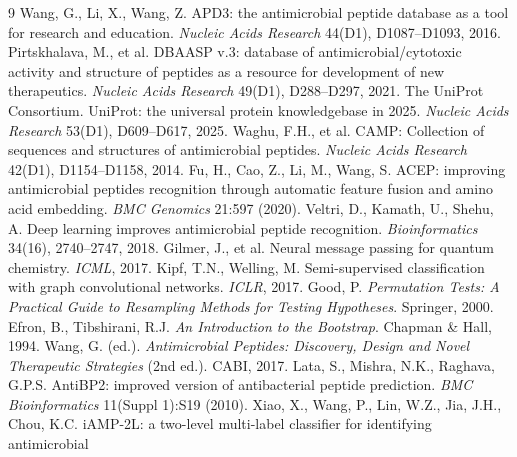 \documentclass[12pt]{article}
\begin{document}
























\begin{thebibliography}{9}
 Wang, G., Li, X., Wang, Z. APD3: the antimicrobial peptide
database as a tool for research and education. \emph{Nucleic Acids Research}
44(D1), D1087--D1093, 2016.
 Pirtskhalava, M., et al. DBAASP v.3: database of
antimicrobial/cytotoxic activity and structure of peptides as a resource for
development of new therapeutics. \emph{Nucleic Acids Research} 49(D1),
D288--D297, 2021.
 The UniProt Consortium. UniProt: the universal protein
knowledgebase in 2025. \emph{Nucleic Acids Research} 53(D1), D609--D617, 2025.
 Waghu, F.H., et al. CAMP: Collection of sequences and
structures of antimicrobial peptides. \emph{Nucleic Acids Research} 42(D1),
D1154--D1158, 2014.
 Fu, H., Cao, Z., Li, M., Wang, S. ACEP: improving antimicrobial
peptides recognition through automatic feature fusion and amino acid embedding.
\emph{BMC Genomics} 21:597 (2020).
 Veltri, D., Kamath, U., Shehu, A. Deep learning improves
antimicrobial peptide recognition. \emph{Bioinformatics} 34(16),
2740--2747, 2018.
 Gilmer, J., et al. Neural message passing for quantum
chemistry. \emph{ICML}, 2017.
 Kipf, T.N., Welling, M. Semi-supervised classification
with graph convolutional networks. \emph{ICLR}, 2017.
 Good, P. \emph{Permutation Tests: A Practical Guide to
Resampling Methods for Testing Hypotheses}. Springer, 2000.
 Efron, B., Tibshirani, R.J. \emph{An Introduction to the
Bootstrap}. Chapman \& Hall, 1994.
 Wang, G. (ed.). \emph{Antimicrobial Peptides: Discovery,
Design and Novel Therapeutic Strategies} (2nd ed.). CABI, 2017.
 Lata, S., Mishra, N.K., Raghava, G.P.S. AntiBP2:
improved version of antibacterial peptide prediction. \emph{BMC
Bioinformatics} 11(Suppl 1):S19 (2010).
 Xiao, X., Wang, P., Lin, W.Z., Jia, J.H., Chou, K.C.
iAMP-2L: a two-level multi-label classifier for identifying antimicrobial

\end{thebibliography}
\end{document}
